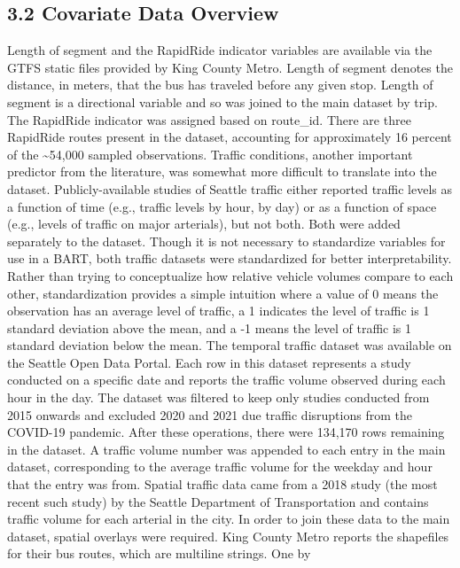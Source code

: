 \documentclass[
  12pt,
]{article}
\begin{document}
\subsection{3.2 Covariate Data Overview}\label{covariate-data-overview}

Length of segment and the RapidRide indicator variables are available
via the GTFS static files provided by King County Metro. Length of
segment denotes the distance, in meters, that the bus has traveled
before any given stop. Length of segment is a directional variable and
so was joined to the main dataset by trip. The RapidRide indicator was
assigned based on route\_id. There are three RapidRide routes present in
the dataset, accounting for approximately 16 percent of the
\textasciitilde54,000 sampled observations. Traffic conditions, another
important predictor from the literature, was somewhat more difficult to
translate into the dataset. Publicly-available studies of Seattle
traffic either reported traffic levels as a function of time (e.g.,
traffic levels by hour, by day) or as a function of space (e.g., levels
of traffic on major arterials), but not both. Both were added separately
to the dataset. Though it is not necessary to standardize variables for
use in a BART, both traffic datasets were standardized for better
interpretability. Rather than trying to conceptualize how relative
vehicle volumes compare to each other, standardization provides a simple
intuition where a value of 0 means the observation has an average level
of traffic, a 1 indicates the level of traffic is 1 standard deviation
above the mean, and a -1 means the level of traffic is 1 standard
deviation below the mean. The temporal traffic dataset was available on
the Seattle Open Data Portal. Each row in this dataset represents a
study conducted on a specific date and reports the traffic volume
observed during each hour in the day. The dataset was filtered to keep
only studies conducted from 2015 onwards and excluded 2020 and 2021 due
traffic disruptions from the COVID-19 pandemic. After these operations,
there were 134,170 rows remaining in the dataset. A traffic volume
number was appended to each entry in the main dataset, corresponding to
the average traffic volume for the weekday and hour that the entry was
from. Spatial traffic data came from a 2018 study (the most recent such
study) by the Seattle Department of Transportation and contains traffic
volume for each arterial in the city. In order to join these data to the
main dataset, spatial overlays were required. King County Metro reports
the shapefiles for their bus routes, which are multiline strings. One by
\end{document}
